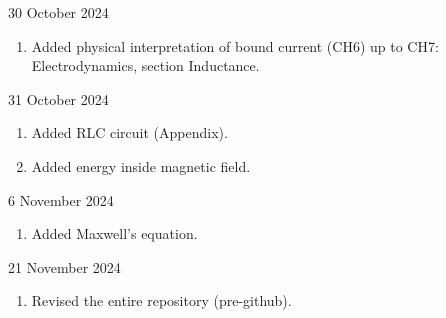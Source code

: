 \documentclass[../main.tex]{subfiles}
\begin{document}
30 October 2024
\begin{enumerate}
    \item Added physical interpretation of bound current (CH6) up to CH7: Electrodynamics, section Inductance.
\end{enumerate}

31 October 2024
\begin{enumerate}
    \item Added RLC circuit (Appendix).
    \item Added energy inside magnetic field.
\end{enumerate}

6 November 2024
\begin{enumerate}
    \item Added Maxwell's equation.
\end{enumerate}

21 November 2024
\begin{enumerate}
    \item Revised the entire repository (pre-github).
\end{enumerate}
\end{document}

